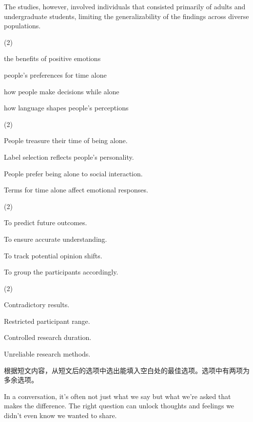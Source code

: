 \documentclass{英语试卷}
\begin{document}
\par The studies, however, involved individuals that consisted primarily of adults and undergraduate students, limiting the generalizability of the findings across diverse populations.\par
{}
\begin{choices}(2)
  \item the benefits of positive emotions
  \item people's preferences for time alone
  \item how people make decisions while alone
  \item how language shapes people's perceptions
\end{choices}
\begin{choices}(2)
  \item People treasure their time of being alone.
  \item Label selection reflects people's personality.
  \item People prefer being alone to social interaction.
  \item Terms for time alone affect emotional responses.
\end{choices}
\begin{choices}(2)
  \item To predict future outcomes.
  \item To ensure accurate understanding.
  \item To track potential opinion shifts.
  \item To group the participants accordingly.
\end{choices}
\begin{choices}(2)
  \item Contradictory results.
  \item Restricted participant range.
  \item Controlled research duration.
  \item Unreliable research methods.
\end{choices}
\par 根据短文内容，从短文后的选项中选出能填入空白处的最佳选项。选项中有两项为多余选项。\par
\par In a conversation, it's often not just what we say but what we're asked that makes the difference. The right question can unlock thoughts and feelings we didn't even know we wanted to share.\par
\end{document}
